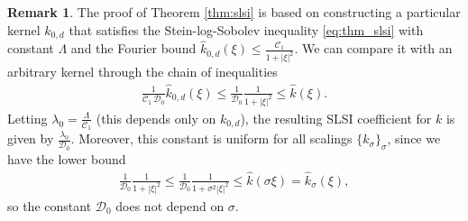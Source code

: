 \documentclass[reqno, 11pt]{amsart}
\numberwithin{equation}{section}
\theoremstyle{definition}
\newtheorem{rem}[thm]{Remark}
\begin{document}
\begin{rem}\label{rem:idea_SLSI_constant_ind_of_scl}
    The proof of Theorem \ref{thm:slsi} is based on constructing a particular kernel $k_{0,d}$ that satisfies the Stein-log-Sobolev inequality \eqref{eq:thm_slsi} with constant $\Lambda$ and the Fourier bound $\hat{k}_{0,d}(\xi) \leq \frac{\mathcal{C}_1}{1+|\xi|^2}$. We can compare it with an arbitrary kernel through the chain of inequalities
    \begin{align*}
        \frac{1}{\mathcal{C}_1\,\mathcal{D}_0}\hat{k}_{0,d}(\xi)\leq \frac{1}{\mathcal{D}_0}\frac{1}{1+|\xi|^2}
        \leq \hat{k}(\xi).
    \end{align*}
    Letting $\lambda_0 = \frac{\Lambda}{\mathcal{C}_1}$ (this depends only on $k_{0,d}$), the resulting SLSI coefficient for $k$ is given by $\frac{\lambda_0}{\mathcal{D}_0}$. Moreover, this constant is uniform for all scalings $\{k_\sigma\}_\sigma$, since we have the lower bound
    \begin{align*}
        \frac{1}{\mathcal{D}_0}\frac{1}{1+|\xi|^2}
        \leq \frac{1}{\mathcal{D}_0}\frac{1}{1+\sigma^2 |\xi|^2}\leq\hat{k}(\sigma\xi)=\hat{k}_\sigma(\xi),
    \end{align*}
    so the constant $\mathcal{D}_0$ does not depend on $\sigma$.
\end{rem}
\end{document}
